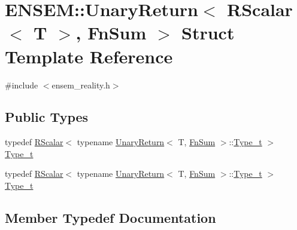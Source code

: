 \hypertarget{structENSEM_1_1UnaryReturn_3_01RScalar_3_01T_01_4_00_01FnSum_01_4}{}\section{E\+N\+S\+EM\+:\+:Unary\+Return$<$ R\+Scalar$<$ T $>$, Fn\+Sum $>$ Struct Template Reference}
\label{structENSEM_1_1UnaryReturn_3_01RScalar_3_01T_01_4_00_01FnSum_01_4}


{\ttfamily \#include $<$ensem\+\_\+reality.\+h$>$}

\subsection*{Public Types}
\begin{DoxyCompactItemize}
\item 
typedef \mbox{\hyperlink{classENSEM_1_1RScalar}{R\+Scalar}}$<$ typename \mbox{\hyperlink{structENSEM_1_1UnaryReturn}{Unary\+Return}}$<$ T, \mbox{\hyperlink{structENSEM_1_1FnSum}{Fn\+Sum}} $>$\+::\mbox{\hyperlink{structENSEM_1_1UnaryReturn_3_01RScalar_3_01T_01_4_00_01FnSum_01_4_aca06bc5e18b4787990a7e7bd5e72d38c}{Type\+\_\+t}} $>$ \mbox{\hyperlink{structENSEM_1_1UnaryReturn_3_01RScalar_3_01T_01_4_00_01FnSum_01_4_aca06bc5e18b4787990a7e7bd5e72d38c}{Type\+\_\+t}}
\item 
typedef \mbox{\hyperlink{classENSEM_1_1RScalar}{R\+Scalar}}$<$ typename \mbox{\hyperlink{structENSEM_1_1UnaryReturn}{Unary\+Return}}$<$ T, \mbox{\hyperlink{structENSEM_1_1FnSum}{Fn\+Sum}} $>$\+::\mbox{\hyperlink{structENSEM_1_1UnaryReturn_3_01RScalar_3_01T_01_4_00_01FnSum_01_4_aca06bc5e18b4787990a7e7bd5e72d38c}{Type\+\_\+t}} $>$ \mbox{\hyperlink{structENSEM_1_1UnaryReturn_3_01RScalar_3_01T_01_4_00_01FnSum_01_4_aca06bc5e18b4787990a7e7bd5e72d38c}{Type\+\_\+t}}
\end{DoxyCompactItemize}


\subsection{Member Typedef Documentation}
\mbox{\label{structENSEM_1_1UnaryReturn_3_01RScalar_3_01T_01_4_00_01FnSum_01_4_aca06bc5e18b4787990a7e7bd5e72d38c}} 
